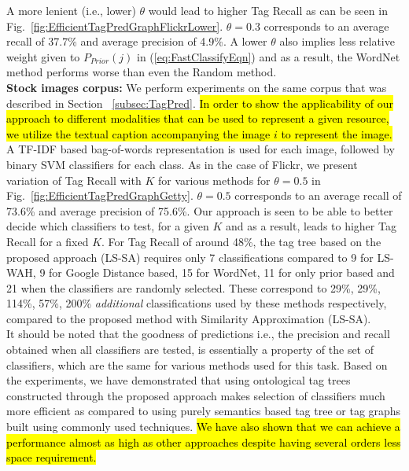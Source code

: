 \indent A more lenient (i.e., lower) $\theta$ would lead to higher Tag Recall as can be seen in Fig.~\ref{fig:EfficientTagPredGraphFlickrLower}. $\theta=0.3$ corresponds to an average recall of 37.7\% and average precision of 4.9\%. A lower $\theta$ also implies less relative weight given to $P_{Prior}(j)$ in (\ref{eq:FastClassifyEqn}) and as a result, the WordNet method performs worse than even the Random method.  \\ 
\indent \textbf{Stock images corpus:} We perform experiments on the same corpus that was described in Section ~\ref{subsec:TagPred}. \hl{In order to show the applicability of our approach to different modalities that can be used to represent a given resource, we utilize
the textual caption accompanying the image $i$ to represent the image.} A TF-IDF based bag-of-words representation is used for each image, followed by binary SVM classifiers for each class. As in the case of Flickr, we present variation of Tag Recall with $K$ for various methods for $\theta=0.5$ in Fig.~\ref{fig:EfficientTagPredGraphGetty}. $\theta=0.5$ corresponds to an average recall of 73.6\% and average precision of 75.6\%. 
Our approach is seen to be able to better decide which classifiers to test, for a given $K$ and as a result, leads to higher Tag Recall for a fixed $K$. For Tag Recall of around 48\%, the tag tree based on the proposed approach (LS-SA) requires only 7 classifications compared to 9 for LS-WAH, 9 for Google Distance based, 15 for WordNet, 11 for only prior based and 21 when the classifiers are randomly selected. These correspond to 29\%, 29\%, 114\%, 57\%, 200\% \textit{additional} classifications used by these methods respectively, compared to the proposed method with Similarity Approximation (LS-SA).  \\ 
\indent It should be noted that the goodness of predictions i.e., the precision and recall obtained when all classifiers are tested, is essentially a property of the set of classifiers, which are the same for various methods used for this task. Based on the experiments, we have demonstrated that using ontological tag trees constructed through the proposed approach makes selection of classifiers much more efficient as compared to using purely semantics based tag tree or tag graphs built using commonly used techniques. \hl{We have also shown that we can achieve a performance almost as high as other approaches despite having several orders less space requirement. 
}
